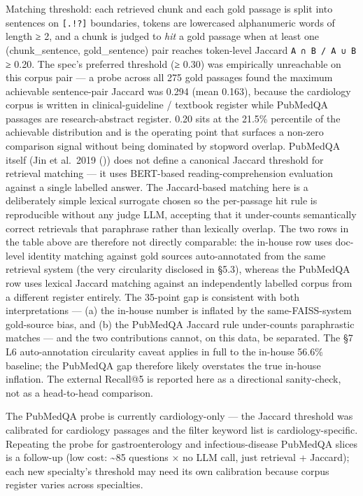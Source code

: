 \documentclass[
  american,
  a4paper,
]{article}
\begin{document}
Matching threshold: each retrieved chunk and each gold passage is split
into sentences on \texttt{{[}.!?{]}} boundaries, tokens are lowercased
alphanumeric words of length ≥ 2, and a chunk is judged to \emph{hit} a
gold passage when at least one (chunk\_sentence, gold\_sentence) pair
reaches token-level Jaccard
\texttt{\textbar{}A\ ∩\ B\textbar{}\ /\ \textbar{}A\ ∪\ B\textbar{}} ≥
0.20. The spec's preferred threshold (≥ 0.30) was empirically
unreachable on this corpus pair --- a probe across all 275 gold passages
found the maximum achievable sentence-pair Jaccard was 0.294 (mean
0.163), because the cardiology corpus is written in clinical-guideline /
textbook register while PubMedQA passages are research-abstract
register. 0.20 sits at the 21.5\% percentile of the achievable
distribution and is the operating point that surfaces a non-zero
comparison signal without being dominated by stopword overlap. PubMedQA
itself (Jin et al.~2019 ()) does not define a canonical Jaccard threshold for retrieval
matching --- it uses BERT-based reading-comprehension evaluation against
a single labelled answer. The Jaccard-based matching here is a
deliberately simple lexical surrogate chosen so the per-passage hit rule
is reproducible without any judge LLM, accepting that it under-counts
semantically correct retrievals that paraphrase rather than lexically
overlap. The two rows in the table above are therefore not directly
comparable: the in-house row uses doc-level identity matching against
gold sources auto-annotated from the same retrieval system (the very
circularity disclosed in §5.3), whereas the PubMedQA row uses lexical
Jaccard matching against an independently labelled corpus from a
different register entirely. The 35-point gap is consistent with both
interpretations --- (a) the in-house number is inflated by the
same-FAISS-system gold-source bias, and (b) the PubMedQA Jaccard rule
under-counts paraphrastic matches --- and the two contributions cannot,
on this data, be separated. The §7 L6 auto-annotation circularity caveat
applies in full to the in-house 56.6\% baseline; the PubMedQA gap
therefore likely overstates the true in-house inflation. The external
Recall@5 is reported here as a directional sanity-check, not as a
head-to-head comparison.

The PubMedQA probe is currently cardiology-only --- the Jaccard
threshold was calibrated for cardiology passages and the filter keyword
list is cardiology-specific. Repeating the probe for gastroenterology
and infectious-disease PubMedQA slices is a follow-up (low cost:
\textasciitilde85 questions × no LLM call, just retrieval + Jaccard);
each new specialty's threshold may need its own calibration because
corpus register varies across specialties.
\end{document}
